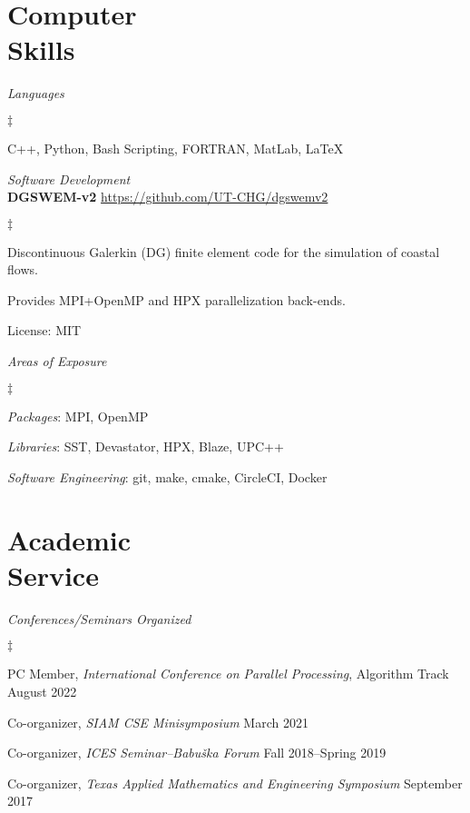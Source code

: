 \documentclass[margin,line]{res}
\newenvironment{list2}{
  \begin{list}{$\ddagger$}{%
      \setlength{\itemsep}{0in}
      \setlength{\parsep}{0in} \setlength{\parskip}{0in}
      \setlength{\topsep}{0in} \setlength{\partopsep}{0in}
      \setlength{\leftmargin}{0.2in}}}{\end{list}}
\begin{document}
\begin{resume}
\section{\sc Computer \\ Skills}

\textit{Languages}
\vspace{0.05in}
\begin{list2}
\item C++, Python, Bash Scripting, FORTRAN, MatLab, \LaTeX
\end{list2}

\textit{Software Development}\\
\vspace{0.05in}
{\bf DGSWEM-v2} \hfill \url{https://github.com/UT-CHG/dgswemv2}
\begin{list2}
\item Discontinuous Galerkin (DG) finite element code for the simulation of coastal flows.
\item Provides MPI+OpenMP and HPX parallelization back-ends.
\item License: MIT
\end{list2}

\textit{Areas of Exposure}
\vspace{0.05in}
\begin{list2}
\item {\em Packages}: MPI, OpenMP
\item {\em Libraries}: SST, Devastator, HPX, Blaze, UPC++
\item {\em Software Engineering}: git, make, cmake, CircleCI, Docker
\end{list2}

\section{\sc Academic \\ Service}

\textit{Conferences/Seminars Organized}
\vspace{0.05in}
\begin{list2}
\item PC Member, {\em International Conference on Parallel Processing}, Algorithm Track \hfill August 2022
\item Co-organizer, {\em SIAM CSE Minisymposium} \hfill March 2021
\item Co-organizer, {\em ICES Seminar--Babu\v{s}ka Forum} \hfill Fall 2018--Spring 2019
\item Co-organizer, {\em Texas Applied Mathematics and Engineering Symposium} \hfill September 2017
\end{list2}


\end{resume}
\end{document}
